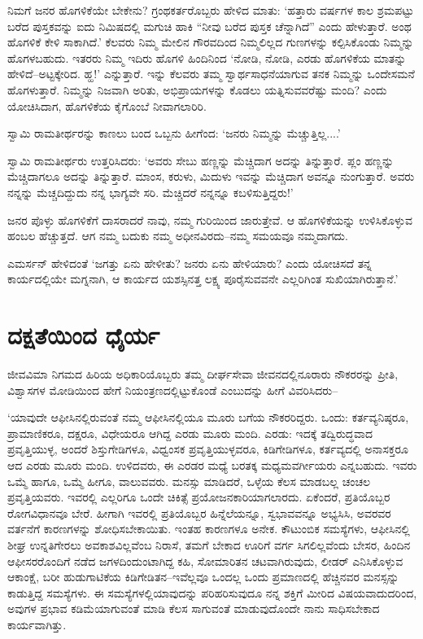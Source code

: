 ನಿಮಗೆ ಜನರ ಹೊಗಳಿಕೆಯೇ ಬೇಕೇನು? ಗ್ರಂಥಕರ್ತರೊಬ್ಬರು ಹೇಳಿದ ಮಾತು: ‘ಹತ್ತಾರು ವರ್ಷಗಳ ಕಾಲ ಶ್ರಮಪಟ್ಟು ಬರೆದ ಪುಸ್ತಕವನ್ನು ಐದು ನಿಮಿಷದಲ್ಲಿ ಮಗುಚಿ ಹಾಕಿ “ನೀವು ಬರೆದ ಪುಸ್ತಕ ಚೆನ್ನಾಗಿದೆ” ಎಂದು ಹೇಳುತ್ತಾರೆ. ಅಂಥ ಹೊಗಳಿಕೆ ಕೇಳಿ ಸಾಕಾಗಿದೆ.’ ಕೆಲವರು ನಿಮ್ಮ ಮೇಲಿನ ಗೌರವದಿಂದ ನಿಮ್ಮಲಿಲ್ಲದ ಗುಣಗಳನ್ನು ಕಲ್ಪಿಸಿಕೊಂಡು ನಿಮ್ಮನ್ನು ಹೊಗಳಬಹುದು. ಇತರರು ನಿಮ್ಮ ಇದಿರು ಹೊಗಳಿ ಹಿಂದಿನಿಂದ ‘ನೋಡಿ, ನೋಡಿ, ಎರಡು ಹೊಗಳಿಕೆಯ ಮಾತನ್ನು ಹೇಳಿದೆ–ಅಟ್ಟಕ್ಕೇರಿದ. ಹ್ಹ!’ ಎನ್ನುತ್ತಾರೆ. ಇನ್ನು ಕೆಲವರು ತಮ್ಮ ಸ್ವಾರ್ಥಸಾಧನೆಯಾಗುವ ತನಕ ನಿಮ್ಮನ್ನು ಒಂದೇಸಮನೆ ಹೊಗಳುತ್ತಾರೆ. ನಿಮ್ಮನ್ನು ನಿಜವಾಗಿ ಅರಿತು, ಅಭಿಪ್ರಾಯಗಳನ್ನು ಕೊಡಲು ಯತ್ನಿಸುವವರೆಷ್ಟು ಮಂದಿ? ಎಂದು ಯೋಚಿಸಿದಾಗ, ಹೊಗಳಿಕೆಯ ಕೈಗೊಂಬೆ ನೀವಾಗಲಾರಿರಿ.

ಸ್ವಾಮಿ ರಾಮತೀರ್ಥರನ್ನು ಕಾಣಲು ಬಂದ ಒಬ್ಬನು ಹೀಗೆಂದ: ‘ಜನರು ನಿಮ್ಮನ್ನು ಮೆಚ್ಚುತ್ತಿಲ್ಲ....’

ಸ್ವಾಮಿ ರಾಮತೀರ್ಥರು ಉತ್ತರಿಸಿದರು: ‘ಅವರು ಸೇಬು ಹಣ್ಣನ್ನು ಮೆಚ್ಚಿದಾಗ ಅದನ್ನು ತಿನ್ನುತ್ತಾರೆ. ಪ್ಲಂ ಹಣ್ಣನ್ನು ಮೆಚ್ಚಿದಾಗಲೂ ಅದನ್ನು ತಿನ್ನುತ್ತಾರೆ. ಮಾಂಸ, ಕರುಳು, ಮಿದುಳು ಇವನ್ನು ಮೆಚ್ಚಿದಾಗ ಅವನ್ನೂ ನುಂಗುತ್ತಾರೆ. ಅವರು ನನ್ನನ್ನು ಮೆಚ್ಚದಿದ್ದುದು ನನ್ನ ಭಾಗ್ಯವೇ ಸರಿ. ಮೆಚ್ಚಿದರೆ ನನ್ನನ್ನೂ ಕಬಳಿಸುತ್ತಿದ್ದರು!’

ಜನರ ಪೊಳ್ಳು ಹೊಗಳಿಕೆಗೆ ದಾಸರಾದರೆ ನಾವು, ನಮ್ಮ ಗುರಿಯಿಂದ ಜಾರುತ್ತೇವೆ. ಆ ಹೊಗಳಿಕೆಯನ್ನು ಉಳಿಸಿಕೊಳ್ಳುವ ಹಂಬಲ ಹೆಚ್ಚುತ್ತದೆ. ಆಗ ನಮ್ಮ ಬದುಕು ನಮ್ಮ ಅಧೀನವಿರದು–ನಮ್ಮ ಸಮಯವೂ ನಮ್ಮದಾಗದು.

ಎಮರ್ಸನ್ ಹೇಳಿದಂತೆ ‘ಜಗತ್ತು ಏನು ಹೇಳೀತು? ಜನರು ಏನು ಹೇಳಿಯಾರು? ಎಂದು ಯೋಚಿಸದೆ ತನ್ನ ಕಾರ್ಯದಲ್ಲಿಯೇ ಮಗ್ನನಾಗಿ, ಆ ಕಾರ್ಯದ ಯಶಸ್ಸಿನತ್ತ ಲಕ್ಷ್ಯ ಪೂರೈಸುವವನೇ ಎಲ್ಲರಿಗಿಂತ ಸುಖಿಯಾಗಿರುತ್ತಾನೆ.’


\section*{ದಕ್ಷತೆಯಿಂದ ಧೈರ್ಯ}


ಜೀವವಿಮಾ ನಿಗಮದ ಹಿರಿಯ ಅಧಿಕಾರಿಯೊಬ್ಬರು ತಮ್ಮ ದೀರ್ಘಸೇವಾ ಜೀವನದಲ್ಲಿ\break ನೂರಾರು ನೌಕರರನ್ನು ಪ್ರೀತಿ, ವಿಶ್ವಾಸಗಳ ಮೋಡಿಯಿಂದ ಹೇಗೆ ನಿಯಂತ್ರಣದಲ್ಲಿಟ್ಟುಕೊಂಡೆ ಎಂಬುದನ್ನು ಹೀಗೆ ವಿವರಿಸಿದರು–

‘ಯಾವುದೇ ಆಫೀಸಿನಲ್ಲಿರುವಂತೆ ನಮ್ಮ ಆಫೀಸಿನಲ್ಲಿಯೂ ಮೂರು ಬಗೆಯ ನೌಕರರಿದ್ದರು. ಒಂದು: ಕರ್ತವ್ಯನಿಷ್ಠರೂ, ಪ್ರಾಮಾಣಿಕರೂ, ದಕ್ಷರೂ, ವಿಧೇಯರೂ ಆಗಿದ್ದ ಎರಡು ಮೂರು ಮಂದಿ. ಎರಡು: ಇದಕ್ಕೆ ತದ್ವಿರುದ್ಧವಾದ ಪ್ರವೃತ್ತಿಯುಳ್ಳ, ಅಂದರೆ ಶಿಸ್ತುಗೇಡಿಗಳೂ, ವಿಧ್ವಂಸಕ ಪ್ರವೃತ್ತಿಯುಳ್ಳವರೂ, ಕಿಡಿಗೇಡಿಗಳೂ, ಕರ್ತವ್ಯದಲ್ಲಿ ಅನಾಸಕ್ತರೂ ಆದ ಎರಡು ಮೂರು ಮಂದಿ. ಉಳಿದವರು, ಈ ಎರಡರ ಮಧ್ಯೆ ಬರತಕ್ಕ ಮಧ್ಯಮವರ್ಗೀಯರು ಎನ್ನಬಹುದು. ಇವರು ಒಮ್ಮೆ ಹಾಗೂ, ಒಮ್ಮೆ ಹೀಗೂ, ವಾಲುವವರು. ಮನಸ್ಸು ಮಾಡಿದರೆ, ಒಳ್ಳೆಯ ಕೆಲಸ ಮಾಡಬಲ್ಲ ಚಂಚಲ ಪ್ರವೃತ್ತಿಯವರು. ಇವರಲ್ಲಿ ಎಲ್ಲರಿಗೂ ಒಂದೇ ಚಿಕಿತ್ಸೆ ಪ್ರಯೋಜನಕಾರಿಯಾಗಲಾರದು. ಏಕೆಂದರೆ, ಪ್ರತಿಯೊಬ್ಬರ ರೋಗವಿಧಾನವೂ ಬೇರೆ. ಹೀಗಾಗಿ ಇವರಲ್ಲಿ ಪ್ರತಿಯೊಬ್ಬರ ಹಿನ್ನೆಲೆಯನ್ನೂ, ಸ್ವಭಾವವನ್ನೂ ಅಭ್ಯಸಿಸಿ, ಅವರವರ ವರ್ತನೆಗೆ ಕಾರಣಗಳನ್ನು ಶೋಧಿಸಬೇಕಾಯಿತು. ಇಂತಹ ಕಾರಣಗಳೂ ಅನೇಕ. ಕೌಟುಂಬಿಕ ಸಮಸ್ಯೆಗಳು, ಆಫೀಸಿನಲ್ಲಿ ಶೀಘ್ರ ಉನ್ನತಿಗೇರಲು ಅವಕಾಶವಿಲ್ಲವೆಂಬ ನಿರಾಸೆ, ತಮಗೆ ಬೇಕಾದ ಊರಿಗೆ ವರ್ಗ ಸಿಗಲಿಲ್ಲವೆಂದು ಬೇಸರ, ಹಿಂದಿನ ಆಫೀಸರರೊಂದಿಗೆ ನಡೆದ ಜಗಳದಿಂದುಂಟಾಗಿದ್ದ ಕಹಿ, ಸೋಮಾರಿತನ ಚಟವಾಗಿರುವುದು, ಲೀಡರ್ ಎನಿಸಿಕೊಳ್ಳುವ ಆಕಾಂಕ್ಷೆ, ಬರೀ ಹುಡುಗಾಟಿಕೆಯ ಕಿಡಿಗೇಡಿತನ–ಇವೆಲ್ಲವೂ ಒಂದಲ್ಲ ಒಂದು ಪ್ರಮಾಣದಲ್ಲಿ ಹೆಚ್ಚಿನವರ ಮನಸ್ಸನ್ನು ಕಾಡುತ್ತಿದ್ದ ಸಮಸ್ಯೆಗಳು. ಈ ಸಮಸ್ಯೆಗಳಲ್ಲಿ\break ಯಾವುದನ್ನು ಪರಿಹರಿಸುವುದೂ ನನ್ನ ಶಕ್ತಿಗೆ ಮೀರಿದ ವಿಷಯವಾದುದರಿಂದ, ಅವುಗಳ ಪ್ರಭಾವ ಕಡಿಮೆಯಾಗುವಂತೆ ಮಾಡಿ ಕೆಲಸ ಸಾಗುವಂತೆ ಮಾಡುವುದೊಂದೇ ನಾನು ಸಾಧಿಸಬೇಕಾದ ಕಾರ್ಯವಾಗಿತ್ತು.

